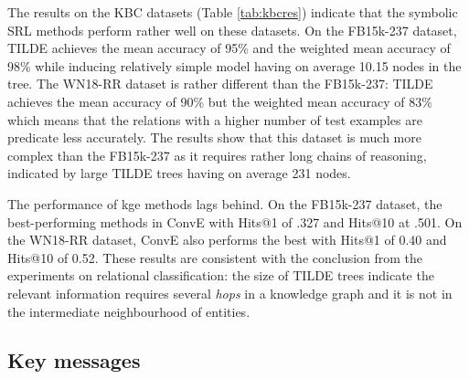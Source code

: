 The results on the KBC datasets (Table \ref{tab:kbcres}) indicate that the symbolic SRL methods perform rather well on these datasets.
On the FB15k-237 dataset, TILDE achieves the mean accuracy of 95\% and the weighted mean accuracy of 98\% while inducing relatively simple model having on average 10.15 nodes in the tree.
The WN18-RR dataset is rather different than the FB15k-237: TILDE achieves the mean accuracy of 90\% but the weighted mean accuracy of 83\% which means that the relations with a higher number of test examples are predicate less accurately.
The results show that this dataset is much more complex than the FB15k-237 as it requires rather long chains of reasoning, indicated by large TILDE trees having on average 231 nodes.


The performance of \gls{kge} methods lags behind.
On the FB15k-237 dataset, the best-performing methods in ConvE with Hits@1 of .327 and Hits@10 at .501.
On the WN18-RR dataset, ConvE also performs the best with Hits@1 of 0.40 and Hits@10 of 0.52.
These results are consistent with the conclusion from the experiments on relational classification: the size of TILDE trees indicate the relevant information requires several \textit{hops} in a knowledge graph and it is not in the intermediate neighbourhood of entities.





\subsection{Key messages}


